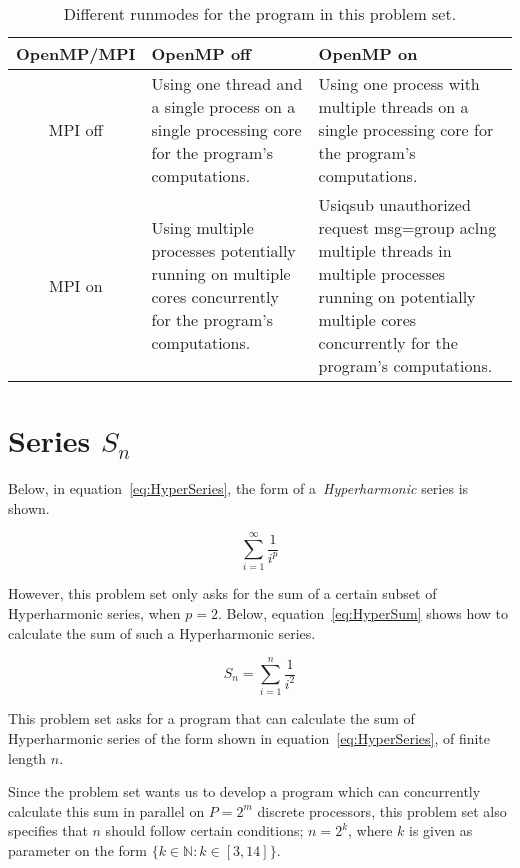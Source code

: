 \documentclass[fontsize=11pt,paper=a4,titlepage]{report}
\begin{document}

\begin{table}[h]
	\begin{tabularx}{\linewidth}{c|X|X|}
			OpenMP/MPI	& OpenMP off & OpenMP on	\\ \hline
			MPI off		& Using one thread and a single process on a single
processing core for the program's computations. & Using one process with
multiple threads on a single processing core for the program's
computations. \\ \hline
			MPI on		& Using multiple processes potentially running on
multiple cores concurrently for the program's computations. & Usiqsub unauthorized request msg=group aclng multiple
threads in multiple processes running on potentially multiple cores concurrently
for the program's computations. \\ \hline
	\end{tabularx}
	\caption{Different runmodes for the program in this problem set.}
	\label{tab:RunModes}
\end{table}

\section{Series $S_n$}

Below, in equation~\ref{eq:HyperSeries}, the form of a~\textit{Hyperharmonic}
series is shown.

\begin{equation}
	\sum_{i=1}^{\infty} \frac{1}{i^p}
	\label{eq:HyperSeries}
\end{equation}

However, this problem set only asks for the sum of a certain subset of
Hyperharmonic series, when $p = 2$. Below, equation~\ref{eq:HyperSum} shows how
to calculate the sum of such a Hyperharmonic series.

\begin{equation}
	S_n = \sum_{i=1}^{n} \frac{1}{i^2}
	\label{eq:HyperSum}
\end{equation}

This problem set asks for a program that can calculate the sum of Hyperharmonic
series of the form shown in equation~\ref{eq:HyperSeries}, of finite length $n$.

Since the problem set wants us to develop a program which can concurrently
calculate this sum in parallel on $P = 2^m$ discrete processors, this problem
set also specifies that $n$ should follow certain conditions; $n = 2^k$, where
$k$ is given as parameter on the form $\{k \in \mathbb{N} : k \in [3, 14]\}$.
\end{document}
